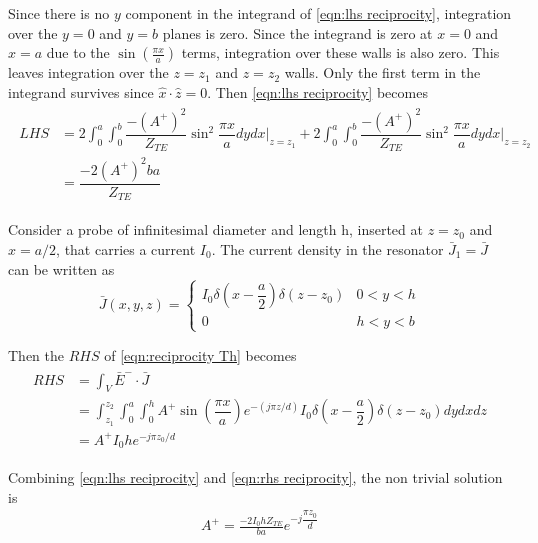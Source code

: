 Since there is no $y$ component in the integrand of \ref{eqn:lhs reciprocity}, integration over the $y=0$ and $y=b$ planes is zero.
Since the integrand is zero at $x=0$ and $x=a$ due to the $\sin\left(\tfrac{\pi x}{a}\right)$ terms, integration over these walls is also zero.
This leaves integration over the $z=z_1$ and $z=z_2$ walls.
Only the first term in the integrand survives since $\hat{x}\cdot\hat{z}=0$. Then \ref{eqn:lhs reciprocity} becomes
\begin{align}
\begin{split}
LHS&=2\int^a_0\int^b_0 \dfrac{-(A^+)^2}{Z_{TE}}\sin^2\dfrac{\pi x}{a}dydx\bigg|_{z=z_1} + 2\int^a_0\int^b_0 \dfrac{-(A^+)^2}{Z_{TE}}\sin^2\dfrac{\pi x}{a}dydx\bigg|_{z=z_2}\\
&=\dfrac{-2(A^+)^2ba}{Z_{TE}}
\end{split}
\end{align}

Consider a probe of infinitesimal diameter and length h, inserted at $z=z_0$ and $x=a/2$, that carries a current $I_0$. The current density in the resonator $\bar{J}_1=\bar{J}$ can be written as
\begin{equation}
\bar{J}(x,y,z)=
\begin{cases}
I_0\delta\left(x-\dfrac{a}{2}\right)\delta(z-z_0)&0<y<h\\
0&h<y<b
\end{cases}
\end{equation}

Then the $RHS$ of \ref{eqn:reciprocity Th} becomes
\begin{align}
\begin{split}
\label{eqn:rhs reciprocity}
RHS&=\int_V\bar{E}^-\cdot\bar{J}\\
&=\int^{z_2}_{z_1}\int^a_0\int^h_0 A^+\sin\left(\dfrac{\pi x}{a}\right)e^{-(j\pi z/d)}I_0\delta\left(x-\dfrac{a}{2}\right)\delta(z-z_0)dydxdz\\
&=A^+I_0he^{-j\pi z_0/d}
\end{split}
\end{align}

Combining \ref{eqn:lhs reciprocity} and \ref{eqn:rhs reciprocity}, the non trivial solution is
\begin{align}
A^+=\frac{-2I_0hZ_{TE}}{ba}e^{-j\dfrac{\pi z_0}{d}}
\end{align}

\fi

